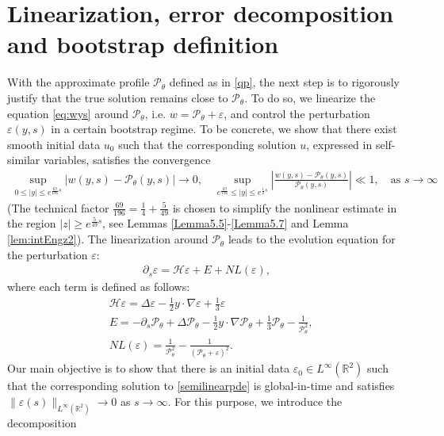 \documentclass[11pt,reqno]{amsart}
\theoremstyle{definition}
\theoremstyle{bfremark}
\numberwithin{equation}{section}
\begin{document}
\section{Linearization, error decomposition and bootstrap definition}
\label{section3}
With the approximate profile \(\mathcal{P}_{\theta}\) defined as in \eqref{qp}, the next step is to rigorously justify that the true solution remains close to $\mathcal{P}_{\theta}$. To do so, we linearize the equation \eqref{eq:wys} around $\mathcal{P}_{\theta}$, i.e. $w = \mathcal{P}_{\theta} + \varepsilon$, and control the perturbation \(\varepsilon(y,s)\) in a certain bootstrap regime. To be concrete, we show that there exist smooth initial data \(u_0\) such that the corresponding solution \(u\), expressed in self-similar variables, satisfies the convergence
\begin{align*}
    \sup_{0 \leq |y| \leq e^{\frac{69}{196}s}}|w(y,s)-\mathcal{P}_{\theta}(y,s)| \to 0, \quad \sup_{e^{\frac{69}{196}} \leq |y| \leq e^{\frac{1}{2}s}}\left|\frac{w(y,s)-\mathcal{P}_{\theta}(y,s)}{\mathcal{P}_{\theta}(y,s)}\right| \ll 1, \quad \text{as } s \to \infty
\end{align*}
(The technical factor $\frac{69}{196} = \frac{1}{4} + \frac{5}{49}$ is chosen to simplify the nonlinear estimate in the region $|z| \geq e^{\frac{5}{49}s}$, see Lemmas \ref{Lemma5.5}-\ref{Lemma5.7} and Lemma \ref{lem:intEngz2}). The linearization around \(\mathcal{P}_{\theta}\) leads to the evolution equation for the perturbation \(\varepsilon\):
\begin{align}    \partial_s\varepsilon=\mathcal{H}\varepsilon+E+NL(\varepsilon),\label{semilinearpde}
\end{align}
where each term is defined as follows:
\begin{align}
    &\mathcal{H}\varepsilon=\Delta \varepsilon-\frac{1}{2}y \cdot \nabla \varepsilon+\frac{1}{3}\varepsilon \label{H}\\
    &E=-\partial_s\mathcal{P}_{\theta}+\Delta \mathcal{P}_{\theta}-\frac{1}{2}y \cdot \nabla \mathcal{P}_{\theta}+\frac{1}{3}\mathcal{P}_{\theta}-\frac{1}{\mathcal{P}_{\theta}^2},\label{E}\\
    &NL(\varepsilon)=\frac{1}{\mathcal{P}_{\theta}^2}-\frac{1}{(\mathcal{P_{\theta}}+\varepsilon)^2}.\label{NL}
\end{align}
Our main objective is to show that there is an initial data $\varepsilon_0 \in L^\infty(\mathbb{R}^2)$ such that the corresponding solution to \eqref{semilinearpde} is global-in-time and satisfies
\(\|\varepsilon(s)\|_{L^{\infty}(\mathbb{R}^2)} \to 0\) as \(s \to \infty\). For this purpose, we introduce the decomposition
\end{document}
